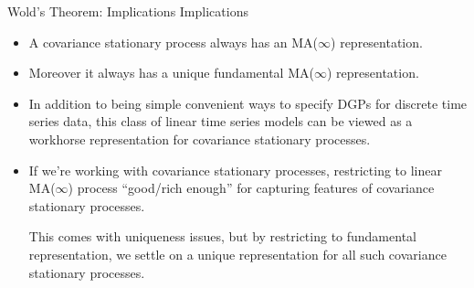 \documentclass[aspectratio=169, handout]{beamer}
\begin{document}
{\footnotesize
\begin{frame}{Wold's Theorem: Implications}
Implications
\begin{itemize}
  \item A covariance stationary process always has an MA($\infty$)
    representation.
  \item Moreover it always has a \alert{unique fundamental}
    MA($\infty$) representation.
  \item In addition to being simple convenient ways to specify DGPs for
    discrete time series data, this class of linear time series models
    can be viewed as a \alert{workhorse representation}
    for covariance stationary processes.
  \item If we're working with covariance stationary processes,
    restricting to linear MA($\infty$) process ``good/rich enough'' for
    capturing features of covariance stationary processes.

    This comes with uniqueness issues, but by restricting to fundamental
    representation, we settle on a unique representation for all such
    covariance stationary processes.
\end{itemize}
\end{frame}
}
\end{document}
